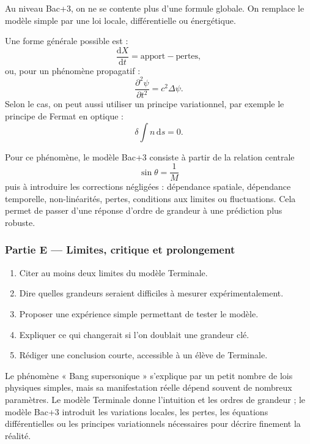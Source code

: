 \documentclass[11pt,a4paper]{article}
\begin{document}
\begin{approfondissementbox}
Au niveau Bac+3, on ne se contente plus d'une formule globale. On remplace le modèle simple par une loi locale, différentielle ou énergétique.

Une forme générale possible est :
\[
\frac{\mathrm d X}{\mathrm dt}=\text{apport}-\text{pertes},
\]
ou, pour un phénomène propagatif :
\[
\frac{\partial^2 \psi}{\partial t^2}=c^2\Delta\psi.
\]
Selon le cas, on peut aussi utiliser un principe variationnel, par exemple le principe de Fermat en optique :
\[
\delta \int n\,\mathrm ds=0.
\]

Pour ce phénomène, le modèle Bac+3 consiste à partir de la relation centrale
\[
\sin\theta=\frac1M
\]
puis à introduire les corrections négligées : dépendance spatiale, dépendance temporelle, non-linéarités, pertes, conditions aux limites ou fluctuations. Cela permet de passer d'une réponse d'ordre de grandeur à une prédiction plus robuste.
\end{approfondissementbox}

\subsubsection*{Partie E — Limites, critique et prolongement}

\begin{enumerate}
  \item Citer au moins deux limites du modèle Terminale.
  \item Dire quelles grandeurs seraient difficiles à mesurer expérimentalement.
  \item Proposer une expérience simple permettant de tester le modèle.
  \item Expliquer ce qui changerait si l'on doublait une grandeur clé.
  \item Rédiger une conclusion courte, accessible à un élève de Terminale.
\end{enumerate}

\begin{corrigebox}
Le phénomène « Bang supersonique » s'explique par un petit nombre de lois physiques simples, mais sa manifestation réelle dépend souvent de nombreux paramètres. Le modèle Terminale donne l'intuition et les ordres de grandeur ; le modèle Bac+3 introduit les variations locales, les pertes, les équations différentielles ou les principes variationnels nécessaires pour décrire finement la réalité.
\end{corrigebox}
\end{document}
